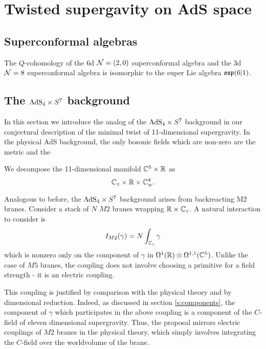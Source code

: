 \section{Twisted supergavity on AdS space}
\label{sec:ads}


\subsection{Superconformal algebras}

\begin{prop}
The $Q$-cohomology of the 6d $\mathcal N=(2,0)$ superconformal algebra and the 3d $\mathcal N=8$ superconformal algebra is isomorphic to the super Lie algebra $\mathfrak{osp}(6|1)$. 
\end{prop} 

\subsection{The ${\rm AdS}_4 \times S^7$ background}

In this section we introduce the analog of the ${\rm AdS}_4 \times S^7$ background in our conjectural description of the minimal twist of 11-dimensional supergravity. 
In the physical AdS background, the only bosonic fields which are non-zero are the metric and the 

\parsec[]

We decompose the 11-dimensional manifold $\mathbb C^5 \times \mathbb R$ as
\[
\mathbb C_z \times \mathbb R \times \mathbb C^4_w .
\]

Analogous to before, the ${\rm AdS}_4 \times S^7$ background arises from backreacting M2 branes. Consider a stack of $N$ $M2$ branes wrapping $\mathbb{R}\times \mathbb{C}_z$. A natural interaction to consider is 
\[
I_{M2}(\gamma) = N\int_{\mathbb{C}_z} \gamma
\] 
which is nonzero only on the component of $\gamma$ in $\Omega^1(\mathbb{R})\otimes \Omega^{1,1}(\mathbb{C}^5)$. Unlike the case of $M5$ branes, the coupling does not involve choosing a primitive for a field strength - it is an electric coupling.

This coupling is justified by comparison with the physical theory and by dimensional reduction. 
Indeed, as discussed in section \ref{s:components}, the component of $\gamma$ which participates in the above coupling is a component of the $C$-field of eleven dimensional supergravity. Thus, the proposal mirrors electric couplings of $M2$ branes in the physical theory, which simply involves integrating the $C$-field over the worldvolume of the brane. 

